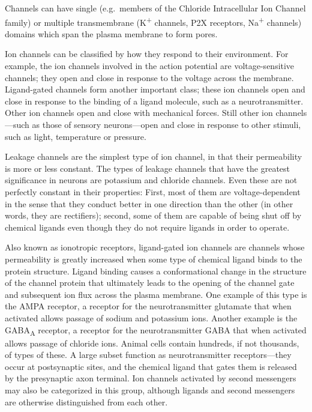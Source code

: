 Channels can have single (e.g.~members of the Chloride Intracellular Ion Channel family) or multiple transmembrane (K\textsuperscript{+} channels, P2X receptors, Na\textsuperscript{+} channels) domains which span the plasma membrane to form pores.

Ion channels can be classified by how they respond to their environment. For example, the ion channels involved in the action potential are voltage-sensitive channels; they open and close in response to the voltage across the membrane. Ligand-gated channels form another important class; these ion channels open and close in response to the binding of a ligand molecule, such as a neurotransmitter. Other ion channels open and close with mechanical forces. Still other ion channels---such as those of sensory neurons---open and close in response to other stimuli, such as light, temperature or pressure.

Leakage channels are the simplest type of ion channel, in that their permeability is more or less constant. The types of leakage channels that have the greatest significance in neurons are potassium and chloride channels. Even these are not perfectly constant in their properties: First, most of them are voltage-dependent in the sense that they conduct better in one direction than the other (in other words, they are rectifiers); second, some of them are capable of being shut off by chemical ligands even though they do not require ligands in order to operate.

Also known as ionotropic receptors, ligand-gated ion channels are channels whose permeability is greatly increased when some type of chemical ligand binds to the protein structure. Ligand binding causes a conformational change in the structure of the channel protein that ultimately leads to the opening of the channel gate and subsequent ion flux across the plasma membrane. One example of this type is the AMPA receptor, a receptor for the neurotransmitter glutamate that when activated allows passage of sodium and potassium ions. Another example is the GABA\textsubscript{A} receptor, a receptor for the neurotransmitter GABA that when activated allows passage of chloride ions. Animal cells contain hundreds, if not thousands, of types of these. A large subset function as neurotransmitter receptors---they occur at postsynaptic sites, and the chemical ligand that gates them is released by the presynaptic axon terminal. Ion channels activated by second messengers may also be categorized in this group, although ligands and second messengers are otherwise distinguished from each other.

